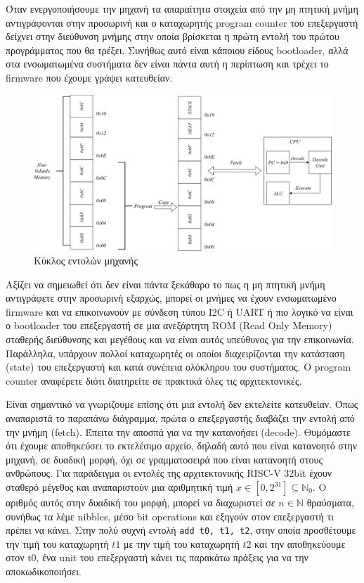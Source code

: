 Όταν ενεργοποιήσουμε την μηχανή τα απαραίτητα στοιχεία από την μη πτητική μνήμη
αντιγράφονται στην προσωρινή και ο καταχωρητής program counter του επεξεργαστή
δείχνει στην διεύθυνση μνήμης στην οποία βρίσκεται η πρώτη εντολή του πρώτου
προγράμματος που θα τρέξει. Συνήθως αυτό είναι κάποιου είδους bootloader, αλλά
στα ενσωματωμένα συστήματα δεν είναι πάντα αυτή η περίπτωση και τρέχει το firmware
που έχουμε γράψει κατευθείαν. 

\begin{figure}[h!]
\centering
\includegraphics[scale=0.4]{images/introduction/instruction_cycle.drawio.png}
\caption{Κύκλος εντολών μηχανής}
 \label{fig:instruction_cycle_workflow}
\end{figure}

Αξίζει να σημειωθεί ότι δεν είναι πάντα ξεκάθαρο το πως η μη πτητική μνήμη αντιγράφετε στην
προσωρινή εξαρχώς, μπορεί οι μνήμες να έχουν ενσωματωμένο firmware και
να επικοινωνούν με σύνδεση τύπου I2C ή UART ή πιο λογικό να είναι ο
bootloader του επεξεργαστή σε μια ανεξάρτητη ROM (Read Only Memory)
σταθερής διεύθυνσης και μεγέθους και να είναι αυτός υπεύθυνος για την
επικοινωνία. Παράλληλα, υπάρχουν πολλοί καταχωρητές οι οποίοι διαχειρίζονται
την κατάσταση (state) του επεξεργαστή και κατά συνέπεια ολόκληρου του συστήματος. Ο program counter
αναφέρετε διότι διατηρείτε σε πρακτικά όλες τις αρχιτεκτονικές. 

Είναι σημαντικό να γνωρίζουμε επίσης ότι μια εντολή δεν εκτελείτε
κατευθείαν. Όπως αναπαριστά το παραπάνω διάγραμμα, πρώτα ο
επεξεργαστής διαβάζει την εντολή από την μνήμη (fetch). Έπειτα την
αποσπά για να την κατανοήσει (decode). Θυμόμαστε ότι έχουμε
αποθηκεύσει το εκτελέσιμο αρχείο, δηλαδή αυτό που είναι κατανοητό στην
μηχανή, σε δυαδική μορφή, όχι σε γραμματοσειρά που είναι κατανοητή
στους ανθρώπους. Για παράδειγμα οι εντολές της αρχιτεκτονικής RISC-V
32bit έχουν σταθερό μέγεθος και αναπαριστούν μια αριθμητική τιμή $x \in
[0, 2^{31}] \subseteq \mathbb{N}_0$. Ο αριθμός αυτός στην δυαδική του μορφή, μπορεί να
διαχωριστεί σε $n\in\mathbb{N}$ θραύσματα, συνήθως τα λέμε nibbles, μέσο bit operations και εξηγούν στον
επεξεργαστή τι πρέπει να κάνει. Στην πολύ συχνή εντολή
\verb|add t0, t1, t2|, στην οποία προσθέτουμε την τιμή του καταχωρητή
$t1$ με την τιμή του καταχωρητή $t2$ και την αποθηκεύουμε στον t0, ένα
unit του επεξεργαστή κάνει τις παρακάτω πράξεις για να την
αποκωδικοποιήσει.


